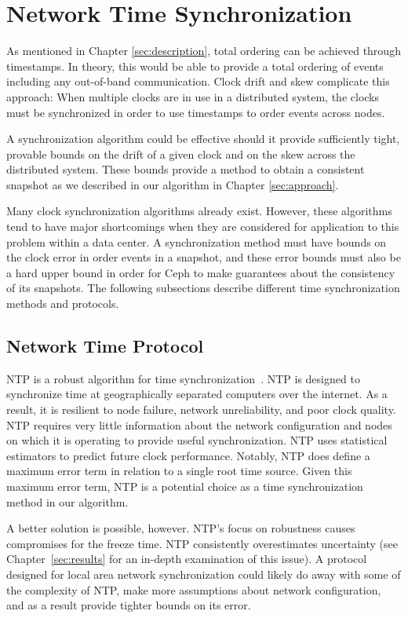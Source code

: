 \section{Network Time Synchronization}

As mentioned in Chapter \ref{sec:description}, total ordering can be
achieved through timestamps. In theory,
this would be able to provide a total ordering of events including
any out-of-band communication. Clock drift and skew complicate this
approach: When multiple clocks are in use in a distributed system,
the clocks must be synchronized in order
to use timestamps to order events across nodes. 

A synchronization algorithm could be effective should it provide
sufficiently tight, provable bounds on the drift of a given clock and
on the skew across the distributed system. These bounds provide a method
to obtain a consistent snapshot as we described in our algorithm in 
Chapter \ref{sec:approach}.

Many clock synchronization algorithms already exist. However, 
these algorithms tend to have major shortcomings when
they are considered for application to this problem within a
data center. A synchronization method must have bounds 
on the clock error in order events in a snapshot, and these 
error bounds must also be a hard upper bound in
order for Ceph to make guarantees about the consistency of its
snapshots. The following subsections describe different time
synchronization methods and protocols.

\subsection{Network Time Protocol}

NTP is a robust algorithm for time
synchronization~\citep{Burbank2010}. NTP is designed to
synchronize time at geographically separated computers over the internet. As a
result, it is resilient to node failure, network unreliability, and
poor clock quality. NTP requires very little information about the
network configuration and nodes on which it is operating to provide useful
synchronization. NTP uses statistical estimators to predict
future clock performance. Notably, NTP does define a maximum error
term in relation to a single root time source. Given this maximum error 
term, NTP is a potential choice as a time synchronization method in 
our algorithm.

A better solution is possible, however. NTP's focus on robustness
causes compromises for the freeze time. NTP consistently overestimates
uncertainty (see Chapter~\ref{sec:results} for an in-depth 
examination of this issue). A protocol designed for local area network
synchronization could likely do away with some of the complexity of
NTP, make more assumptions about network configuration, and as a
result provide tighter bounds on its error.

